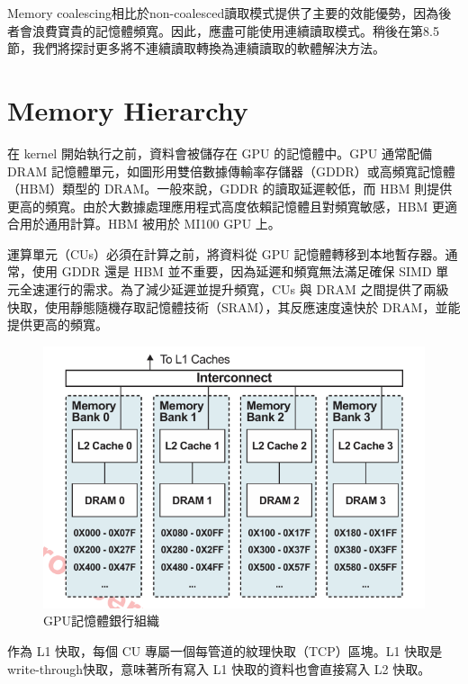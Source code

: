 \vspace{1em}
Memory coalescing相比於non-coalesced讀取模式提供了主要的效能優勢，因為後者會浪費寶貴的記憶體頻寬。因此，應盡可能使用連續讀取模式。稍後在第8.5節，我們將探討更多將不連續讀取轉換為連續讀取的軟體解決方法。

\section{Memory Hierarchy}
在 kernel 開始執行之前，資料會被儲存在 GPU 的記憶體中。GPU 通常配備 DRAM 記憶體單元，如圖形用雙倍數據傳輸率存儲器（GDDR）或高頻寬記憶體（HBM）類型的 DRAM。一般來說，GDDR 的讀取延遲較低，而 HBM 則提供更高的頻寬。由於大數據處理應用程式高度依賴記憶體且對頻寬敏感，HBM 更適合用於通用計算。HBM 被用於 MI100 GPU 上。

\vspace{1em}
運算單元（CUs）必須在計算之前，將資料從 GPU 記憶體轉移到本地暫存器。通常，使用 GDDR 還是 HBM 並不重要，因為延遲和頻寬無法滿足確保 SIMD 單元全速運行的需求。為了減少延遲並提升頻寬，CUs 與 DRAM 之間提供了兩級快取，使用靜態隨機存取記憶體技術（SRAM），其反應速度遠快於 DRAM，並能提供更高的頻寬。


\begin{figure}
    \centering
    \includegraphics[width=1\linewidth]{FileAusiliari//Screenshots/Figure6-5.png}
    \caption{GPU記憶體銀行組織}
    \label{fig:enter-label}
\end{figure}



\vspace{1em}
作為 L1 快取，每個 CU 專屬一個每管道的紋理快取（TCP）區塊。L1 快取是write-through快取，意味著所有寫入 L1 快取的資料也會直接寫入 L2 快取。

